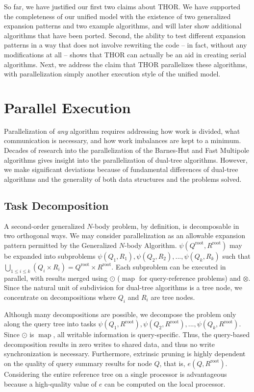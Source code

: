 \documentclass[twoside,leqno,twocolumn]{article}
\newcommand{\Union}{\bigcup}
\DeclareMathOperator*{\map}{map}
\newcommand{\gnp}{\psi}
\newcommand{\kdroot}[1]{#1^{\text{root}}}
\newcommand{\lettermu}{e}
\newcommand{\inmu}{e}
\begin{document}
So far, we have justified our first two claims about THOR.
We have supported the completeness of our unified model with the existence of two generalized expansion patterns and two example algorithms, and will later show additional algorithms that have been ported.
Second, the ability to test different expansion patterns in a way that does not involve rewriting the code -- in fact, without any modifications at all -- shows that THOR can actually be an aid in creating serial algorithms.
Next, we address the claim that THOR parallelizes these algorithms, with parallelization simply another execution style of the unified model.

\section{Parallel Execution}

Parallelization of {\em any} algorithm requires addressing how work is divided, what communication is necessary, and how work imbalances are kept to a minimum.
Decades of research into the parallelization of the Barnes-Hut and Fast Multipole algorithms gives insight into the parallelization of dual-tree algorithms.
However, we make significant deviations because of fundamental differences of dual-tree algorithms and the generality of both data structures and the problems solved.

\subsection{Task Decomposition}

A second-order generalized $N$-body problem, by definition, is decomposable in two orthogonal ways.
We may consider parallelization as an allowable expansion pattern permitted by the Generalized $N$-body Algorithm.
$\gnp(\kdroot{Q}, \kdroot{R})$ may be expanded into subproblems $\gnp(Q_1,R_1), \gnp(Q_2,R_2), ..., \gnp(Q_k, R_k)$ such that $\Union_{1 \leq i \leq k} (Q_i \times R_i) = \kdroot{Q} \times \kdroot{R}$.
Each subproblem can be executed in parallel, with results merged using $\odot$ ($\map$ for query-reference problems) and $\otimes$.
Since the natural unit of subdivision for dual-tree algorithms is a tree node, we concentrate on decompositions where $Q_i$ and $R_i$ are tree nodes.

Although many decompositions are possible, we decompose the problem only along the query tree into tasks $\gnp(Q_1, \kdroot{R}), \gnp(Q_2, \kdroot{R}), ..., \gnp(Q_k, \kdroot{R})$.
Since $\odot$ is $\map$, all writable information is query-specific.
Thus, the query-based decomposition results in zero writes to shared data, and thus no write synchronization is necessary.
Furthermore, extrinsic pruning is highly dependent on the quality of query summary results for node $Q$, that is, $\inmu(Q, \kdroot{R})$.
Considering the entire reference tree on a single processor is advantageous because a high-quality value of $\lettermu$ can be computed on the local processor.
\end{document}
